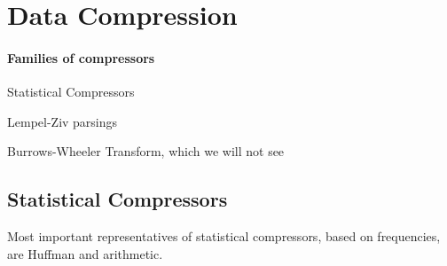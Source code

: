 \documentclass[10pt]{report}
\begin{document}
\section{Data Compression}
\paragraph{Families of compressors}\begin{list}{}{}
	\item Statistical Compressors
	\item Lempel-Ziv parsings
	\item Burrows-Wheeler Transform, which we will not see
\end{list}
\subsection{Statistical Compressors}
Most important representatives of statistical compressors, based on frequencies, are Huffman and arithmetic.
\end{document}
